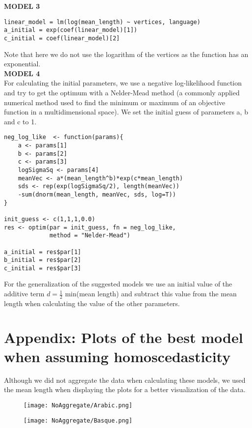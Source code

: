 \documentclass{article}
\begin{document}
\noindent \textbf{MODEL 3}
\begin{lstlisting}
linear_model = lm(log(mean_length) ~ vertices, language)
a_initial = exp(coef(linear_model)[1])
c_initial = coef(linear_model)[2]
\end{lstlisting}
Note that here we do not use the logarithm of the vertices as the function has an exponential. \\

\noindent \textbf{MODEL 4} \\
For calculating the initial parameters, we use a negative log-likelihood function and try to get the optimum with a Nelder-Mead method (a commonly applied numerical method used to find the minimum or maximum of an objective function in a multidimensional space). We set the initial guess of parameters a, b and c to 1.
\begin{lstlisting}
neg_log_like  <- function(params){
    a <- params[1]
    b <- params[2]
    c <- params[3]
    logSigmaSq <- params[4]
    meanVec <- a*(mean_length^b)*exp(c*mean_length)
    sds <- rep(exp(logSigmaSq/2), length(meanVec))
    -sum(dnorm(mean_length, meanVec, sds, log=T))
}

init_guess <- c(1,1,1,0.0)
res <- optim(par = init_guess, fn = neg_log_like,
             method = "Nelder-Mead")

a_initial = res$par[1]
b_initial = res$par[2]
c_initial = res$par[3]
\end{lstlisting}

For the generalization of the suggested models we use an initial value of the additive term $d = \frac{1}{2}$ min(mean length) and subtract this value from the mean length when calculating the value of the other parameters.

\newpage
\section*{Appendix: Plots of the best model when assuming homoscedasticity}
Although we did not aggregate the data when calculating these models, we used the mean length when displaying the plots for a better visualization of the data.


\begin{figure}[H]
\centering
\texttt{[image: NoAggregate/Arabic.png]}
\label{fig:globfig}
\end{figure}

\begin{figure}[H]
\centering
\texttt{[image: NoAggregate/Basque.png]}
\label{fig:globfig}
\end{figure}
\end{document}
